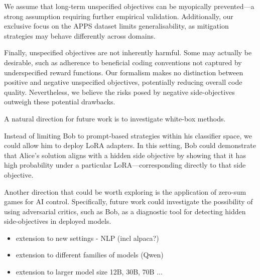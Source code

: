
We assume that long-term unspecified objectives can be myopically prevented---a strong assumption requiring further empirical validation. Additionally, our exclusive focus on the APPS dataset limits generalisability, as mitigation strategies may behave differently across domains.

Finally, unspecified objectives are not inherently harmful. Some may actually be desirable, such as adherence to beneficial coding conventions not captured by underspecified reward functions. Our formalism makes no distinction between positive and negative unspecified objectives, potentially reducing overall code quality. Nevertheless, we believe the risks posed by negative side-objectives outweigh these potential drawbacks.

A natural direction for future work is to investigate white-box methods. 

Instead of limiting Bob to prompt-based strategies within his classifier space, we could allow him to deploy LoRA adapters. In this setting, Bob could demonstrate that Alice’s solution aligns with a hidden side objective by showing that it has high probability under a particular LoRA—corresponding directly to that side objective.

Another direction that could be worth exploring is the application of zero-sum games for AI control. Specifically, future work could investigate the possibility of using adversarial critics, such as Bob, as a diagnostic tool for detecting hidden side-objectives in deployed models.

\begin{itemize}
    \item extension to new settings - NLP (incl alpaca?)
    \item extension to different families of models (Qwen)
    \item extension to larger model size 12B, 30B, 70B ... 
\end{itemize}